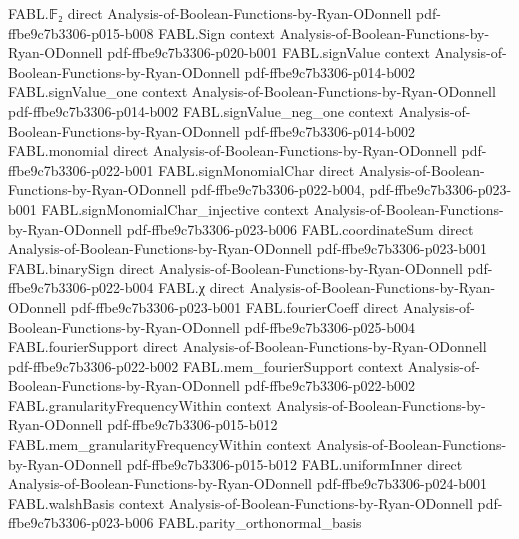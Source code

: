 \begin{theorem}
\proofstep
  {FABL.𝔽₂}
  {direct}
  {Analysis-of-Boolean-Functions-by-Ryan-ODonnell}
  {pdf-ffbe9c7b3306-p015-b008}
\proofstep
  {FABL.Sign}
  {context}
  {Analysis-of-Boolean-Functions-by-Ryan-ODonnell}
  {pdf-ffbe9c7b3306-p020-b001}
\proofstep
  {FABL.signValue}
  {context}
  {Analysis-of-Boolean-Functions-by-Ryan-ODonnell}
  {pdf-ffbe9c7b3306-p014-b002}
\proofstep
  {FABL.signValue_one}
  {context}
  {Analysis-of-Boolean-Functions-by-Ryan-ODonnell}
  {pdf-ffbe9c7b3306-p014-b002}
\proofstep
  {FABL.signValue_neg_one}
  {context}
  {Analysis-of-Boolean-Functions-by-Ryan-ODonnell}
  {pdf-ffbe9c7b3306-p014-b002}
\proofstep
  {FABL.monomial}
  {direct}
  {Analysis-of-Boolean-Functions-by-Ryan-ODonnell}
  {pdf-ffbe9c7b3306-p022-b001}
\proofstep
  {FABL.signMonomialChar}
  {direct}
  {Analysis-of-Boolean-Functions-by-Ryan-ODonnell}
  {pdf-ffbe9c7b3306-p022-b004,
    pdf-ffbe9c7b3306-p023-b001}
\proofstep
  {FABL.signMonomialChar_injective}
  {context}
  {Analysis-of-Boolean-Functions-by-Ryan-ODonnell}
  {pdf-ffbe9c7b3306-p023-b006}
\proofstep
  {FABL.coordinateSum}
  {direct}
  {Analysis-of-Boolean-Functions-by-Ryan-ODonnell}
  {pdf-ffbe9c7b3306-p023-b001}
\proofstep
  {FABL.binarySign}
  {direct}
  {Analysis-of-Boolean-Functions-by-Ryan-ODonnell}
  {pdf-ffbe9c7b3306-p022-b004}
\proofstep
  {FABL.χ}
  {direct}
  {Analysis-of-Boolean-Functions-by-Ryan-ODonnell}
  {pdf-ffbe9c7b3306-p023-b001}
\proofstep
  {FABL.fourierCoeff}
  {direct}
  {Analysis-of-Boolean-Functions-by-Ryan-ODonnell}
  {pdf-ffbe9c7b3306-p025-b004}
\proofstep
  {FABL.fourierSupport}
  {direct}
  {Analysis-of-Boolean-Functions-by-Ryan-ODonnell}
  {pdf-ffbe9c7b3306-p022-b002}
\proofstep
  {FABL.mem_fourierSupport}
  {context}
  {Analysis-of-Boolean-Functions-by-Ryan-ODonnell}
  {pdf-ffbe9c7b3306-p022-b002}
\proofstep
  {FABL.granularityFrequencyWithin}
  {context}
  {Analysis-of-Boolean-Functions-by-Ryan-ODonnell}
  {pdf-ffbe9c7b3306-p015-b012}
\proofstep
  {FABL.mem_granularityFrequencyWithin}
  {context}
  {Analysis-of-Boolean-Functions-by-Ryan-ODonnell}
  {pdf-ffbe9c7b3306-p015-b012}
\proofstep
  {FABL.uniformInner}
  {direct}
  {Analysis-of-Boolean-Functions-by-Ryan-ODonnell}
  {pdf-ffbe9c7b3306-p024-b001}
\proofstep
  {FABL.walshBasis}
  {context}
  {Analysis-of-Boolean-Functions-by-Ryan-ODonnell}
  {pdf-ffbe9c7b3306-p023-b006}
\proofstep
  {FABL.parity_orthonormal_basis}

\end{theorem}
